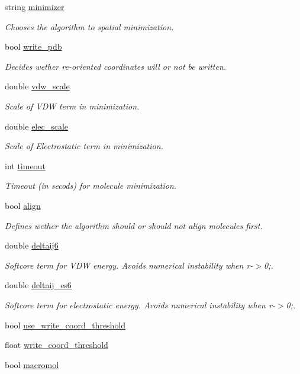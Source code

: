 \begin{DoxyCompactItemize}
string \hyperlink{classParser_ad13db04a963874a5cdfcc21b74e157c8}{minimizer}
\begin{DoxyCompactList}\small\item\em Chooses the algorithm to spatial minimization. \end{DoxyCompactList}\item 
bool \hyperlink{classParser_ae5704efc1c1353fdc47e1e8c369516fc}{write\_\-pdb}
\begin{DoxyCompactList}\small\item\em Decides wether re-\/oriented coordinates will or not be written. \end{DoxyCompactList}\item 
double \hyperlink{classParser_a3dd10708e371fd27b05fcfb3e3caac62}{vdw\_\-scale}
\begin{DoxyCompactList}\small\item\em Scale of VDW term in minimization. \end{DoxyCompactList}\item 
double \hyperlink{classParser_a848002312e9561eca6d4d6ebcf9c0138}{elec\_\-scale}
\begin{DoxyCompactList}\small\item\em Scale of Electrostatic term in minimization. \end{DoxyCompactList}\item 
int \hyperlink{classParser_a674ed2371f1689ee54cd8b6b29324b65}{timeout}
\begin{DoxyCompactList}\small\item\em Timeout (in secods) for molecule minimization. \end{DoxyCompactList}\item 
bool \hyperlink{classParser_a55ff6e4e374bb795d761a0b96d7e24d3}{align}
\begin{DoxyCompactList}\small\item\em Defines wether the algorithm should or should not align molecules first. \end{DoxyCompactList}\item 
double \hyperlink{classParser_a37e294cd788ca37540592f9bff930757}{deltaij6}
\begin{DoxyCompactList}\small\item\em Softcore term for VDW energy. Avoids numerical instability when r-\/$>$0;. \end{DoxyCompactList}\item 
double \hyperlink{classParser_ae28df0a3a3e5ee001ece1bec87f34aca}{deltaij\_\-es6}
\begin{DoxyCompactList}\small\item\em Softcore term for electrostatic energy. Avoids numerical instability when r-\/$>$0;. \end{DoxyCompactList}\item 
bool \hyperlink{classParser_adf5a767adcb85a53e31ef2ad7232c75e}{use\_\-write\_\-coord\_\-threshold}
\item 
float \hyperlink{classParser_a136c2191cbc90fcce8277ad2f98031b8}{write\_\-coord\_\-threshold}
\item 
bool \hyperlink{classParser_a126f993711c0fbbb87b6789f169c8aa0}{macromol}
\end{DoxyCompactItemize}


